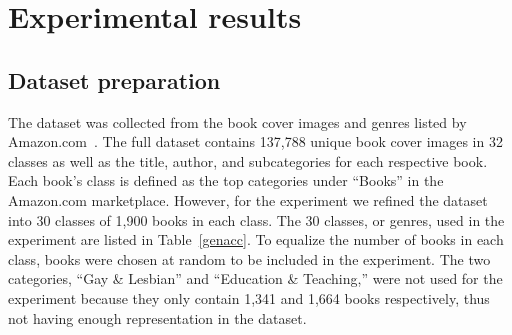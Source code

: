 \documentclass[conference]{IEEEtran}
\begin{document}
\section{Experimental results}
\label{results}


\subsection{Dataset preparation}
\label{results:prep}
The dataset was collected from the book cover images and genres listed by Amazon.com~\cite{amazon}.
The full dataset contains 137,788 unique book cover images in 32 classes as well as the title, author, and subcategories for each respective book.
Each book's class is defined as the top categories under ``Books'' in the Amazon.com marketplace.
However, for the experiment we refined the dataset into 30 classes of 1,900 books in each class. 
The 30 classes, or genres, used in the experiment are listed in Table~\ref{genacc}.
To equalize the number of books in each class, books were chosen at random to be included in the experiment. 
The two categories, ``Gay \& Lesbian'' and ``Education \& Teaching,'' were not used for the experiment because they only contain 1,341 and 1,664 books respectively, thus not having enough representation in the dataset. 
\end{document}
